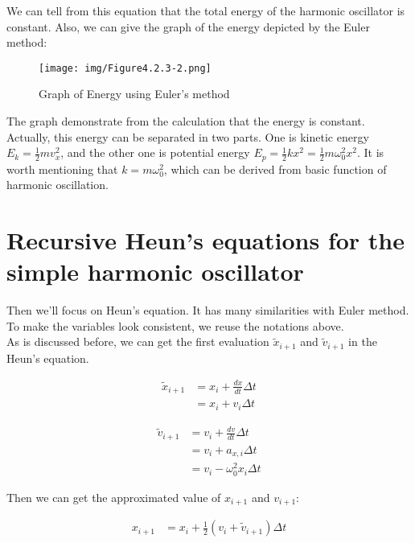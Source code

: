 \documentclass[12pt]{article}
\begin{document}
We can tell from this equation that the total energy of the harmonic oscillator is constant. Also, we can give the graph of the energy depicted by the Euler method: 

\begin{figure}[htb]
    \centering
    \texttt{[image: img/Figure4.2.3-2.png]}
    \caption{Graph of Energy using Euler's method}
\end{figure} 

The graph demonstrate from the calculation that the energy is constant. Actually, this energy can be separated in two parts. One is kinetic energy $E_k = \frac{1}{2}mv_x^2$, and the other one is potential energy $E_p = \frac{1}{2} k x^2 = \frac{1}{2} m \omega_0^2 x^2$. It is worth mentioning that $k = m \omega_0^2$, which can be derived from basic function of harmonic oscillation. 



\section{Recursive Heun's equations for the simple harmonic
oscillator}

Then we'll focus on Heun's equation. It has many similarities with Euler method. To make the variables look consistent, we reuse the notations above. \\

As is discussed before, we can get the first evaluation $\tilde{x}_{i+1}$ and $\tilde{v}_{i+1}$ in the Heun's equation. 

\begin{align}
    \tilde{x}_{i+1}  &= x_{i} + \frac{dx}{dt} \Delta t \\
                     &= x_{i} + v_{i} \Delta t \nonumber 
\end{align}

\begin{align}
    \tilde{v}_{i+1} &= v_{i} + \frac{dv}{dt} \Delta t \\
                    &= v_{i} + a_{x,i} \Delta t \nonumber \\
                    &= v_{i} - \omega_{0}^2 x_{i} \Delta t \nonumber 
\end{align}

Then we can get the approximated value of $x_{i+1}$ and $v_{i+1}$: 

\begin{align}
    x_{i+1} &= x_{i} + \frac{1}{2} (v_{i} + \tilde{v}_{i+1}) \Delta t
\end{align}
\end{document}
